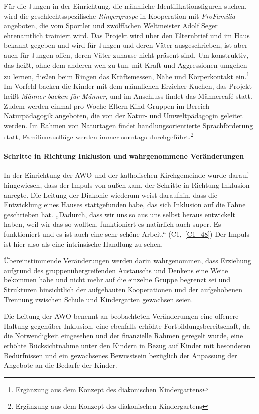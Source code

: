 Für die Jungen in der Einrichtung, die männliche Identifikationsfiguren suchen, wird die geschlechtsspezifische \emph{Ringergruppe} in Kooperation mit \emph{ProFamilia} angeboten, die vom Sportler und zwölffachen Weltmeister Adolf Seger ehrenamtlich trainiert wird. Das Projekt wird über den Elternbrief und im Haus bekannt gegeben und wird für Jungen und deren Väter ausgeschrieben, ist aber auch für Jungen offen, deren Väter zuhause nicht präsent sind. Um konstruktiv, das heißt, ohne dem anderen weh zu tun, mit Kraft und Aggressionen umgehen zu lernen, fließen beim Ringen das Kräftemessen, Nähe und Körperkontakt ein.\footnote{Ergänzung aus dem Konzept des diakonischen Kindergartens} Im Vorfeld backen die Kinder mit dem männlichen Erzieher Kuchen, das Projekt heißt \emph{Männer backen für Männer}, und im Anschluss findet das Männercafé statt.
Zudem werden einmal pro Woche Eltern-Kind-Gruppen im Bereich Naturpädagogik angeboten, die von der Natur- und Umweltpädagogin geleitet werden. Im Rahmen von Naturtagen findet handlungsorientierte Sprachförderung statt, Familienausflüge werden immer sonntags durchgeführt.\footnote{Ergänzung aus dem Konzept des diakonischen Kindergartens}

\paragraph{Schritte in Richtung Inklusion und wahrgenommene Veränderungen}

In der Einrichtung der AWO und der katholischen Kirchgemeinde wurde darauf hingewiesen, dass der Impuls von außen kam, der Schritte in Richtung Inklusion anregte. Die Leitung der Diakonie wiederum weist daraufhin, dass die Entwicklung eines Hauses stattgefunden habe, das sich Inklusion auf die Fahne geschrieben hat. „Dadurch, dass wir uns so aus uns selbst heraus entwickelt haben, weil wir das so wollten, funktioniert es natürlich auch super. Es funktioniert und es ist auch eine sehr schöne Arbeit.“ (C1,~\ref{C1_48}) Der Impuls ist hier also als eine intrinsische Handlung zu sehen.

Übereinstimmende Veränderungen werden darin wahrgenommen, dass Erziehung aufgrund des gruppenübergreifenden Austauschs und Denkens  eine Weite bekommen habe und nicht mehr auf die einzelne Gruppe begrenzt sei und Strukturen hinsichtlich der aufgebauten Kooperationen und der aufgehobenen Trennung zwischen Schule und Kindergarten gewachsen seien.  

Die Leitung der AWO benennt an beobachteten Veränderungen eine offenere Haltung gegenüber Inklusion, eine ebenfalls erhöhte Fortbildungsbereitschaft, da die Notwendigkeit eingesehen und der finanzielle Rahmen geregelt wurde, eine erhöhte Rücksichtnahme unter den Kindern in Bezug auf Kinder mit besonderen Bedürfnissen und ein gewachsenes Bewusstsein bezüglich der Anpassung der Angebote an die  Bedarfe der Kinder. 

